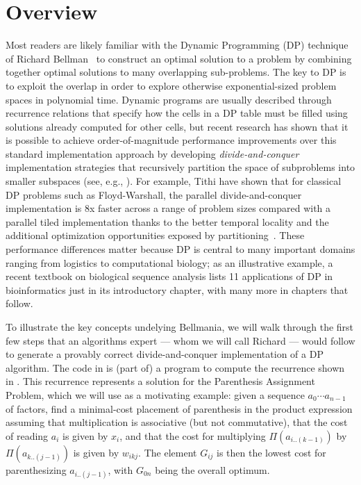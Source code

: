 \section{Overview}
\label{overview}

Most readers are likely familiar with the Dynamic Programming (DP) technique of Richard Bellman~\cite{03/Bellman:DP} to construct an optimal solution to a problem by combining together optimal solutions to many overlapping sub-problems. The key to DP is to exploit the overlap in order to explore otherwise exponential-sized problem spaces in polynomial time. Dynamic programs are usually described through recurrence relations that specify how the cells in a DP table must be filled using solutions already computed for other cells, but recent research has shown that it is possible to achieve order-of-magnitude performance improvements over this standard implementation approach by developing \emph{divide-and-conquer}  implementation strategies that recursively
partition the space of subproblems into smaller subspaces (see, e.g., \cite{IPDPS15/Tithi}).   For example, Tithi \etal{} have shown that for classical DP problems such as Floyd-Warshall, the parallel divide-and-conquer implementation is  8x faster  across a range of problem sizes compared with a parallel tiled implementation thanks to the better temporal locality and the additional optimization opportunities exposed by partitioning~\cite{IPDPS15/Tithi}. These performance differences matter because  DP is central to many important domains ranging from logistics to computational biology; as an illustrative example, a recent textbook \cite{DurbinEdKr98} on biological sequence analysis lists 11 applications of DP in bioinformatics just in its introductory chapter, with many more in chapters that follow. 

\newcommand{\xidx}{i}
\newcommand{\yidx}{j}
\newcommand{\xw}[1]{w^x_{#1}}
\newcommand{\yw}[1]{w^y_{#1}}


To illustrate the key concepts undelying Bellmania, we will walk through the first
few steps that an algorithms expert --- whom we will call Richard --- would follow to
generate a provably correct divide-and-conquer implementation of a DP algorithm.
The code in  is (part of) a program to compute the recurrence
shown in . This recurrence represents a solution
for the Parenthesis Assignment Problem, which we will use as a motivating example:
given a sequence $a_0\!\cdots a_{n-1}$
of factors, find a minimal-cost placement of parenthesis in the product expression
assuming that multiplication is associative (but not commutative), that the cost
of reading $a_i$ is given by $x_i$, and that the cost for multiplying
$\Pi(a_{i..(k-1)})$ by $\Pi(a_{k..(j-1)})$ is given by $w_{ikj}$.
The element $G_{ij}$ is then the lowest cost for parenthesizing $a_{i..(j-1)}$,
with $G_{0n}$ being the overall optimum.

